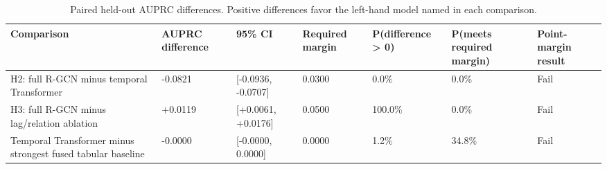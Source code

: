 \begin{table}
\caption{Paired held-out AUPRC differences. Positive differences favor the left-hand model named in each comparison.}
\label{tab:paired-auprc-differences}
\begin{tabular}{lllllll}
\toprule
Comparison & AUPRC difference & 95\% CI & Required margin & P(difference > 0) & P(meets required margin) & Point-margin result \\
\midrule
H2: full R-GCN minus temporal Transformer & -0.0821 & [-0.0936, -0.0707] & 0.0300 & 0.0\% & 0.0\% & Fail \\
H3: full R-GCN minus lag/relation ablation & +0.0119 & [+0.0061, +0.0176] & 0.0500 & 100.0\% & 0.0\% & Fail \\
Temporal Transformer minus strongest fused tabular baseline & -0.0000 & [-0.0000, 0.0000] & 0.0000 & 1.2\% & 34.8\% & Fail \\
\bottomrule
\end{tabular}
\end{table}
